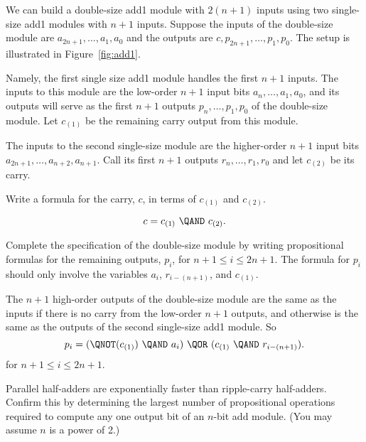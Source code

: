 \documentclass[handout]{mcs}
\begin{document}
\begin{problem}
\begin{solution}
\end{solution}

\eparts

We can build a double-size add1 module with $2(n+1)$ inputs using two
single-size add1 modules with $n+1$ inputs.  Suppose the inputs of the
double-size module are $a_{2n+1},\dots, a_1, a_0$ and the outputs are
$c,p_{2n+1},\dots, p_1,p_0$.  The setup is illustrated in
Figure~\ref{fig:add1}.

Namely, the first single size add1 module handles the first $n+1$ inputs.
The inputs to this module are the low-order $n+1$ input bits $a_n,\dots,
a_1, a_0$, and its outputs will serve as the first $n+1$ outputs $p_n,
\dots, p_1, p_0$ of the double-size module.  Let $c_{(1)}$ be the
remaining carry output from this module.

The inputs to the second single-size module are the higher-order $n+1$
input bits $a_{2n+1}, \dots, a_{n+2}, a_{n+1}$.  Call its first $n+1$
outputs $r_n, \dots, r_1, r_0$ and let $c_{(2)}$ be its carry.

\bparts

\ppart Write a formula for the carry, $c$, in terms of $c_{(1)}$ and
$c_{(2)}$.

\begin{solution}

\[
c = c_{(1)}\ \QAND\ c_{(2)}.
\]

\end{solution}

\ppart Complete the specification of the double-size module by writing
propositional formulas for the remaining outputs, $p_i$, for $n+1 \leq i
\leq 2n+1$.  The formula for $p_i$ should only involve the variables
$a_i$, $r_{i-(n+1)}$, and $c_{(1)}$.

\begin{solution}
 The $n+1$ high-order outputs of the double-size module are the
  same as the inputs if there is no carry from the low-order $n+1$
  outputs, and otherwise is the same as the outputs of the second
  single-size add1 module.  So
\begin{equation}\label{parallel-pi}
p_i = (\QNOT(c_{(1)})\ \QAND\ a_i)\ \QOR\ (c_{(1)}\ \QAND\ r_{i-(n+1)}).
\end{equation}
for $n+1 \leq i \leq 2n+1$.
\end{solution}

\ppart Parallel half-adders are exponentially faster than ripple-carry
half-adders.  Confirm this by determining the largest number of
propositional operations required to compute any one output bit of an
$n$-bit add module.  (You may assume $n$ is a power of 2.)


\end{problem}
\end{document}
